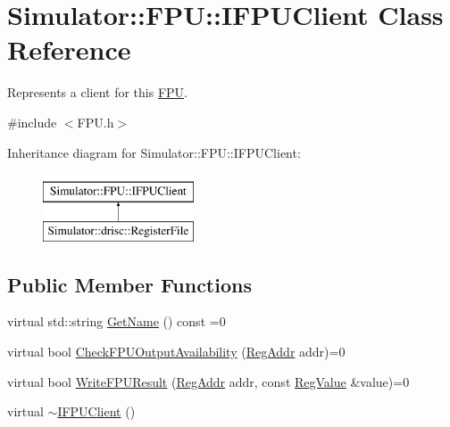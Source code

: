 \hypertarget{class_simulator_1_1_f_p_u_1_1_i_f_p_u_client}{\section{Simulator\+:\+:F\+P\+U\+:\+:I\+F\+P\+U\+Client Class Reference}
\label{class_simulator_1_1_f_p_u_1_1_i_f_p_u_client}
}


Represents a client for this \hyperlink{class_simulator_1_1_f_p_u}{F\+P\+U}.  




{\ttfamily \#include $<$F\+P\+U.\+h$>$}

Inheritance diagram for Simulator\+:\+:F\+P\+U\+:\+:I\+F\+P\+U\+Client\+:\begin{figure}[H]
\begin{center}
\leavevmode
\includegraphics[height=2.000000cm]{class_simulator_1_1_f_p_u_1_1_i_f_p_u_client}
\end{center}
\end{figure}
\subsection*{Public Member Functions}
\begin{DoxyCompactItemize}
\item 
virtual std\+::string \hyperlink{class_simulator_1_1_f_p_u_1_1_i_f_p_u_client_a5588985669fd1772318c9b88e3f44869}{Get\+Name} () const =0
\item 
virtual bool \hyperlink{class_simulator_1_1_f_p_u_1_1_i_f_p_u_client_a2e7336c7e6b0c9a33445c2312345b4ce}{Check\+F\+P\+U\+Output\+Availability} (\hyperlink{struct_simulator_1_1_reg_addr}{Reg\+Addr} addr)=0
\item 
virtual bool \hyperlink{class_simulator_1_1_f_p_u_1_1_i_f_p_u_client_acd84130d336c322969ea07948b6d0405}{Write\+F\+P\+U\+Result} (\hyperlink{struct_simulator_1_1_reg_addr}{Reg\+Addr} addr, const \hyperlink{struct_simulator_1_1_reg_value}{Reg\+Value} \&value)=0
\item 
virtual \hyperlink{class_simulator_1_1_f_p_u_1_1_i_f_p_u_client_ab949da9645e70f31b38623e87dac151a}{$\sim$\+I\+F\+P\+U\+Client} ()
\end{DoxyCompactItemize}


